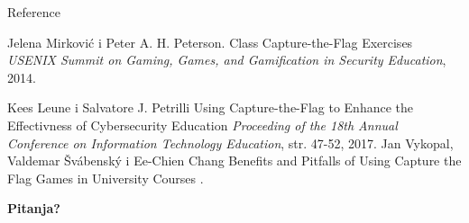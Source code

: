 \documentclass[aspectratio=169,xcolor=dvipsnames]{beamer}
\begin{document}
\begin{frame}{Reference}
    \footnotesize{
        \begin{thebibliography}{99}
             Jelena Mirković i 
                Peter A. H. Peterson.
                \newblock Class Capture-the-Flag Exercises
                \newblock \emph{USENIX Summit on Gaming, Games, and 
                Gamification in Security Education}, 2014.

             Kees Leune i 
                Salvatore J. Petrilli
                \newblock Using Capture-the-Flag to Enhance the Effectivness
                of Cybersecurity Education
                \newblock \emph{Proceeding of the 18th Annual Conference
                on Information Technology Education}, str. 47-52, 2017.
             Jan Vykopal, Valdemar 
                Švábenský i Ee-Chien Chang
                \newblock Benefits and Pitfalls of Using Capture the Flag
                Games in University Courses
                .

        \end{thebibliography}
    }
\end{frame}


\begin{frame}
    \Huge{\centerline{\textbf{Pitanja?}}}
\end{frame}

\end{document}
